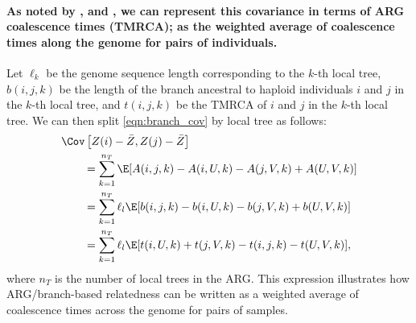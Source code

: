 \paragraph{As noted by \cite{mcvean2009genealogical, fan2022genealogical}, and \cite{zhang2023biobank},
we can represent this covariance in terms of ARG coalescence times (TMRCA);
as the weighted average of coalescence times along the genome for pairs of individuals.}
%
Let $\ell_k$ be the genome sequence length corresponding to the $k$-th local tree,
$b(i,j,k)$ be the length of the branch ancestral to haploid individuals $i$ and $j$ in the $k$-th local tree, and
$t(i,j,k)$ be the TMRCA of $i$ and $j$ in the $k$-th local tree.
%
We can then split \eqref{eqn:branch_cov} by local tree as follows:
%
\begin{align}
    &\Cov\left[Z(i) - \bar{Z}, Z(j) - \bar{Z}\right] \notag \\
        &\qquad = \sum_{k = 1}^{n_T}        \E[A(i,j,k) - A(i,U,k) - A(j,V,k) + A(U,V,k)] \\
        &\qquad = \sum_{k = 1}^{n_T} \ell_l \E[b(i,j,k) - b(i,U,k) - b(j,V,k) + b(U,V,k)] \\
        &\qquad = \sum_{k = 1}^{n_T} \ell_l \E[t(i,U,k) + t(j,V,k) - t(i,j,k) - t(U,V,k)],
\end{align}
%
where $n_T$ is the number of local trees in the ARG.
%
This expression illustrates how ARG/branch-based relatedness can be written as
a weighted average of coalescence times across the genome for pairs of samples.

%


